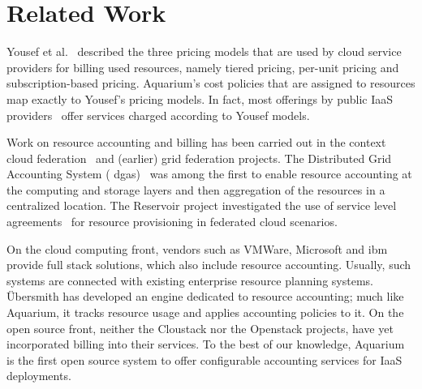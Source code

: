 \documentclass[letterpaper,twocolumn,10pt]{article}
\begin{document}

\section{Related Work}

Yousef et al.~\cite{Youse08} described the three pricing models that
are used by cloud service providers for billing used resources, namely
tiered pricing, per-unit pricing and subscription-based pricing.
Aquarium's cost policies that are assigned to resources map exactly to
Yousef's pricing models. In fact, most offerings by public IaaS
providers~\cite{Azure12, Amaz12} offer services charged according to
Yousef models.

Work on resource accounting and billing has been carried out in the
context cloud federation~\cite{Rochw09, Elmro09} and (earlier) grid
federation projects. The Distributed Grid Accounting System ({\sc
  dgas})~\cite{Piro06} was among the first to enable resource
accounting at the computing and storage layers and then aggregation of
the resources in a centralized location. The Reservoir project
investigated the use of service level agreements~\cite{Elmro09} for
resource provisioning in federated cloud scenarios.

On the cloud computing front, vendors such as VMWare, Microsoft and
{\sc ibm} provide full stack solutions, which also include resource
accounting. Usually, such systems are connected with existing
enterprise resource planning systems. \"Ubersmith has developed an
engine dedicated to resource accounting; much like Aquarium, it tracks
resource usage and applies accounting policies to it. On the open
source front, neither the Cloustack nor the Openstack projects, have
yet incorporated billing into their services. To the best of our
knowledge, Aquarium is the first open source system to offer
configurable accounting services for IaaS deployments.
\end{document}
